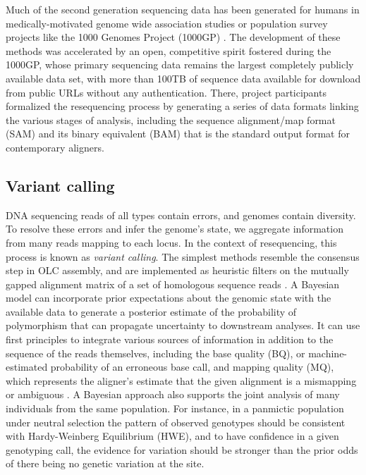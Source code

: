 Much of the second generation sequencing data has been generated for humans in medically-motivated genome wide association studies \cite{uk10k2015uk10k} or population survey projects like the 1000 Genomes Project (1000GP) \cite{1000Gphase1,1000g2015}. %
The development of these methods was accelerated by an open, competitive spirit fostered during the 1000GP, whose primary sequencing data remains the largest completely publicly available data set, with more than 100TB of sequence data available for download from public URLs without any authentication.
There, project participants formalized the resequencing process by generating a series of data formats linking the various stages of analysis, including the sequence alignment/map format (SAM) and its binary equivalent (BAM) \cite{li2009sequence} that is the standard output format for contemporary aligners.


\subsection{Variant calling}

DNA sequencing reads of all types contain errors, and genomes contain diversity.
To resolve these errors and infer the genome's state, we aggregate information from many reads mapping to each locus.
In the context of resequencing, this process is known as \emph{variant calling}.
The simplest methods resemble the consensus step in OLC assembly, and are implemented as heuristic filters on the mutually gapped alignment matrix of a set of homologous sequence reads \cite{koboldt2009varscan}.
A Bayesian model can incorporate prior expectations about the genomic state with the available data to generate a posterior estimate of the probability of polymorphism that can propagate uncertainty to downstream analyses.
It can use first principles to integrate various sources of information in addition to the sequence of the reads themselves, including the base quality (BQ), or machine-estimated probability of an erroneous base call, and mapping quality (MQ), which represents the aligner's estimate that the given alignment is a mismapping or ambiguous \cite{li2011statistical}.
A Bayesian approach also supports the joint analysis of many individuals from the same population.
For instance, in a panmictic population under neutral selection the pattern of observed genotypes should be consistent with Hardy-Weinberg Equilibrium (HWE), and to have confidence in a given genotyping call, the evidence for variation should be stronger than the prior odds of there being no genetic variation at the site.


